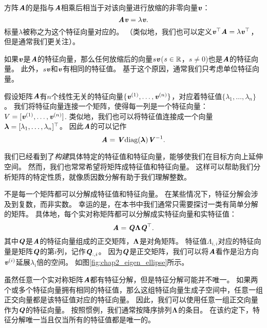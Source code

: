 方阵$\MA$的是指与$\MA$相乘后相当于对该向量进行放缩的非零向量$\Vv$：
\begin{equation}
    \MA\Vv=\lambda \Vv.
\end{equation}
标量$\lambda$被称之为这个特征向量对应的。
（类似地，我们也可以定义$\Vv^\top\MA=\lambda \Vv^\top$，但是通常我们更关注）。


如果$\Vv$是$\MA$的特征向量，那么任何放缩后的向量$s\Vv$($s\in \SetR$，$s\neq 0$)也是$\MA$的特征向量。
此外，$s\Vv$和$\Vv$有相同的特征值。
基于这个原因，通常我们只考虑单位特征向量。


假设矩阵$\MA$有$n$个线性无关的特征向量$\{\Vv^{(1)}, \dots, \Vv^{(n)}\}$，对应着特征值$\{\lambda_1, \dots , \lambda_n \}$。
我们将特征向量连接一个矩阵，使得每一列是一个特征向量：$V=[\Vv^{(1)}, \dots, \Vv^{(n)}]$.
类似地，我们也可以将特征值连接成一个向量$\Vlambda = [\lambda_1, \dots , \lambda_n]^\top$。
因此$\MA$的可以记作
\begin{equation}
    \MA = \MV \text{diag}(\mathbf{\Vlambda}) \MV^{-1}.
\end{equation}


我们已经看到了\emph{构建}具体特定的特征值和特征向量，能够使我们在目标方向上延伸空间。
然而，我们也常常希望将矩阵成特征值和特征向量。
这样可以帮助我们分析矩阵的特定性质，就像质因数分解有助于我们理解整数。


不是每一个矩阵都可以分解成特征值和特征向量。
在某些情况下，特征分解会涉及到复数，而非实数。
幸运的是，在本书中我们通常只需要探讨一类有简单分解的矩阵。
具体地，每个实对称矩阵都可以分解成实特征向量和实特征值：
\begin{equation}
    \MA = \MQ \VLambda \MQ^\top.
\end{equation}
其中$\MQ$是$\MA$的特征向量组成的正交矩阵，$\VLambda$是对角矩阵。
特征值$\Lambda_{i,i}$对应的特征向量是矩阵$\MQ$的第$i$列，记作$\MQ_{:,i}$。
因为$\MQ$是正交矩阵，我们可以将$\MA$看作是沿方向$\Vv^{(i)}$延展$\lambda_i$倍的空间。
如图\ref{fig:chap2_eigen_ellipse}所示。


虽然任意一个实对称矩阵$\MA$都有特征分解，但是特征分解可能并不唯一。
如果两个或多个特征向量拥有相同的特征值，那么这组特征向量生成子空间中，任意一组正交向量都是该特征值对应的特征向量。
因此，我们可以使用任意一组正交向量作为$\MQ$的特征向量。
按照惯例，我们通常按降序排列$\VLambda$的条目。
在该约定下，特征分解唯一当且仅当所有的特征值都是唯一的。

